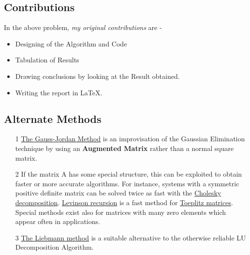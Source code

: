 \documentclass[titlepage, 11pt]{article}
\begin{document}

\subsection{Contributions}
In the above problem, \textit{my original contributions} are - 
\begin{itemize}
    \item Designing of the Algorithm and Code
    \item Tabulation of Results
    \item Drawing conclusions by looking at the Result obtained.
    \item Writing the report in LaTeX. 
\end{itemize}


\subsection{Alternate Methods}
\begin{itemize}
   \item [1] \href{https://math.libretexts.org/Bookshelves/Applied_Mathematics/Applied_Finite_Mathematics_(Sekhon_and_Bloom)/02%3A_Matrices/2.02%3A_Systems_of_Linear_Equations_and_the_Gauss-Jordan_Method}{The Gauss-Jordan Method} is an improvisation of the Gaussian Elimination technique by using an \textbf{Augmented Matrix} rather than a normal square matrix. 
    \item [2] If the matrix A has some special structure, this can be exploited to obtain faster or more accurate algorithms. For instance, systems with a symmetric positive definite matrix can be solved twice as fast with the \href{https://en.wikipedia.org/wiki/Cholesky_decomposition}{Cholesky decomposition}. \href{https://en.wikipedia.org/wiki/Levinson_recursion}{Levinson recursion} is a fast method for \href{https://en.wikipedia.org/wiki/Toeplitz_matrix}{Toeplitz matrices}. Special methods exist also for matrices with many zero elements which appear often in applications.
    \item [3] \href{https://en.wikipedia.org/wiki/Gauss%E2%80%93Seidel_method#:~:text=In%20numerical%20linear%20algebra%2C%20the,a%20system%20of%20linear%20equations.}{The Liebmann method} is a suitable alternative to the otherwise reliable LU Decomposition Algorithm. 
    \end{itemize}
% 
% 
\end{document}
